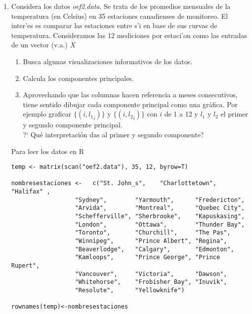 \documentclass[12pt]{book}
\newcommand {\?}{?`}
\begin{document}
\begin{enumerate}
\item
Considera los datos {\it oef2.data}. Se trata de los promedios mensuales de la temperatura (en Celsius) en 35 estaciones canadienses de monitoreo. El inter'es es
comparar las estaciones entre s'i en base de sus curvas de temperatura.
Consideramos  las 12 mediciones por estaci'on como las entradas de un vector (v.a.) $X$



\begin{enumerate}
\item
Busca algunas visualizaciones informativos de los datos.
\item 
Calcula los componentes principales.
\item 
Aprovechando que las columnas hacen referencia a meses consecutivos, tiene sentido dibujar cada componente principal como una gr\'afica. Por ejemplo graficar $\{(i,{l_1}_i)\}$ y $\{(i,{l_2}_i)\}$ con $i$ de 1 a 12 y $l_1$ y $l_2$ el primer y segundo componente principal. \\



\? Qu\'e interpretaci\' on das al primer y segundo componente?



\end{enumerate}


Para leer los datos en {\cal R}
\begin{verbatim}
temp <- matrix(scan("oef2.data"), 35, 12, byrow=T)

nombresestaciones <-   c("St. John_s",    "Charlottetown", "Halifax" ,
                  "Sydney",        "Yarmouth",      "Fredericton",
                  "Arvida",        "Montreal",      "Quebec City",
                  "Schefferville", "Sherbrooke",    "Kapuskasing",
                  "London",        "Ottawa",        "Thunder Bay",
                  "Toronto",       "Churchill",     "The Pas",
                  "Winnipeg",      "Prince Albert", "Regina",
                  "Beaverlodge",   "Calgary",       "Edmonton",
                  "Kamloops",      "Prince George", "Prince Rupert",
                  "Vancouver",     "Victoria",      "Dawson",
                  "Whitehorse",    "Frobisher Bay", "Inuvik",
                  "Resolute",      "Yellowknife")

rownames(temp)<-nombresestaciones

\end{verbatim} \mbox{} \\




\end{enumerate}
\end{document}
